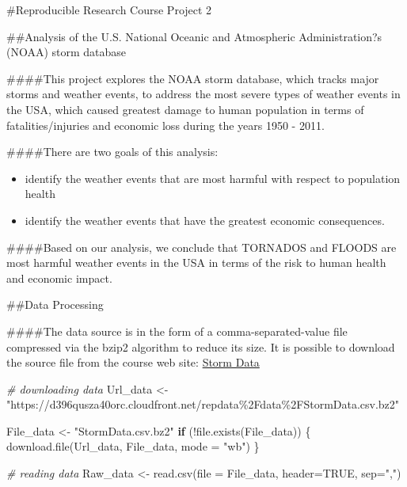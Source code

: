 \documentclass[
]{article}
\author{}
\date{\vspace{-2.5em}}
\newenvironment{Shaded}{\begin{snugshade}}{\end{snugshade}}
\newcommand{\AttributeTok}[1]{\textcolor[rgb]{0.77,0.63,0.00}{#1}}
\newcommand{\CommentTok}[1]{\textcolor[rgb]{0.56,0.35,0.01}{\textit{#1}}}
\newcommand{\ConstantTok}[1]{\textcolor[rgb]{0.00,0.00,0.00}{#1}}
\newcommand{\ControlFlowTok}[1]{\textcolor[rgb]{0.13,0.29,0.53}{\textbf{#1}}}
\newcommand{\FunctionTok}[1]{\textcolor[rgb]{0.00,0.00,0.00}{#1}}
\newcommand{\NormalTok}[1]{#1}
\newcommand{\OtherTok}[1]{\textcolor[rgb]{0.56,0.35,0.01}{#1}}
\newcommand{\SpecialCharTok}[1]{\textcolor[rgb]{0.00,0.00,0.00}{#1}}
\newcommand{\StringTok}[1]{\textcolor[rgb]{0.31,0.60,0.02}{#1}}
\providecommand{\tightlist}{%
  \setlength{\itemsep}{0pt}\setlength{\parskip}{0pt}}
\begin{document}
\#Reproducible Research Course Project 2

\#\#Analysis of the U.S. National Oceanic and Atmospheric
Administration?s (NOAA) storm database

\#\#\#\#This project explores the NOAA storm database, which tracks
major storms and weather events, to address the most severe types of
weather events in the USA, which caused greatest damage to human
population in terms of fatalities/injuries and economic loss during the
years 1950 - 2011.

\#\#\#\#There are two goals of this analysis:

\begin{itemize}
\tightlist
\item
  identify the weather events that are most harmful with respect to
  population health
\item
  identify the weather events that have the greatest economic
  consequences.
\end{itemize}

\#\#\#\#Based on our analysis, we conclude that TORNADOS and FLOODS are
most harmful weather events in the USA in terms of the risk to human
health and economic impact.

\#\#Data Processing

\#\#\#\#The data source is in the form of a comma-separated-value file
compressed via the bzip2 algorithm to reduce its size. It is possible to
download the source file from the course web site:
\href{https://d396qusza40orc.cloudfront.net/repdata\%2Fdata\%2FStormData.csv.bz2}{Storm
Data}

\begin{Shaded}
\begin{Highlighting}[]
\CommentTok{\# downloading data}
\NormalTok{Url\_data }\OtherTok{\textless{}{-}} \StringTok{"https://d396qusza40orc.cloudfront.net/repdata\%2Fdata\%2FStormData.csv.bz2"}

\NormalTok{File\_data }\OtherTok{\textless{}{-}} \StringTok{"StormData.csv.bz2"}
\ControlFlowTok{if}\NormalTok{ (}\SpecialCharTok{!}\FunctionTok{file.exists}\NormalTok{(File\_data)) \{}
        \FunctionTok{download.file}\NormalTok{(Url\_data, File\_data, }\AttributeTok{mode =} \StringTok{"wb"}\NormalTok{)}
\NormalTok{\}}

\CommentTok{\# reading data}
\NormalTok{Raw\_data }\OtherTok{\textless{}{-}} \FunctionTok{read.csv}\NormalTok{(}\AttributeTok{file =}\NormalTok{ File\_data, }\AttributeTok{header=}\ConstantTok{TRUE}\NormalTok{, }\AttributeTok{sep=}\StringTok{","}\NormalTok{)}
\end{Highlighting}
\end{Shaded}
\end{document}
